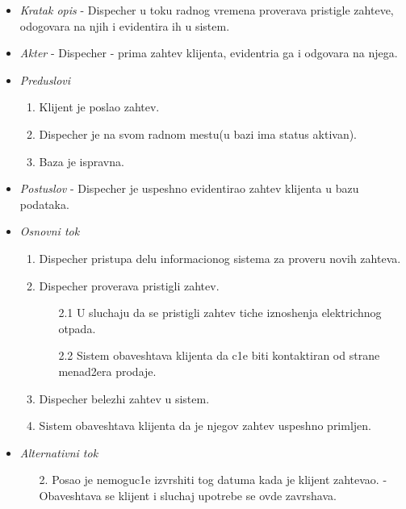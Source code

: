 \documentclass[10 pt]{article}
\begin{document}
		\begin{itemize}
			\item\textit{Kratak opis} - Dispecher u toku radnog vremena proverava pristigle zahteve, odogovara na njih i evidentira ih u sistem.
			
			\item\textit{Akter} - Dispecher - prima zahtev klijenta, evidentria ga i odgovara na njega.
			
			\item\textit{Preduslovi}
				\begin{enumerate}
					\item Klijent je poslao zahtev.
					\item Dispecher je na svom radnom mestu(u bazi ima status aktivan).
					\item Baza je ispravna.
				\end{enumerate} 
			
			\item\textit{Postuslov} - Dispecher je uspeshno evidentirao zahtev klijenta u bazu podataka.
			
			\item\textit{Osnovni tok}
				\begin{enumerate}
					\item Dispecher pristupa delu informacionog sistema za proveru novih zahteva.
					\item Dispecher proverava pristigli zahtev.
						\begin{enumerate}
							\item[2.1] U sluchaju da se pristigli zahtev tiche iznoshenja elektrichnog otpada.
							\item[2.2] Sistem obaveshtava klijenta da c1e biti kontaktiran od strane menad2era prodaje.
						\end{enumerate}
					\item Dispecher belezhi zahtev u sistem.
					\item Sistem obaveshtava klijenta da je njegov zahtev uspeshno primljen.
				\end{enumerate}
	
			\item\textit{Alternativni tok}
				\begin{enumerate}
					\item [2.] Posao je nemoguc1e izvrshiti tog datuma kada je klijent zahtevao. - Obaveshtava se klijent i sluchaj upotrebe se ovde zavrshava.
				\end{enumerate}
		\end{itemize}
	\newpage	
\end{document}
